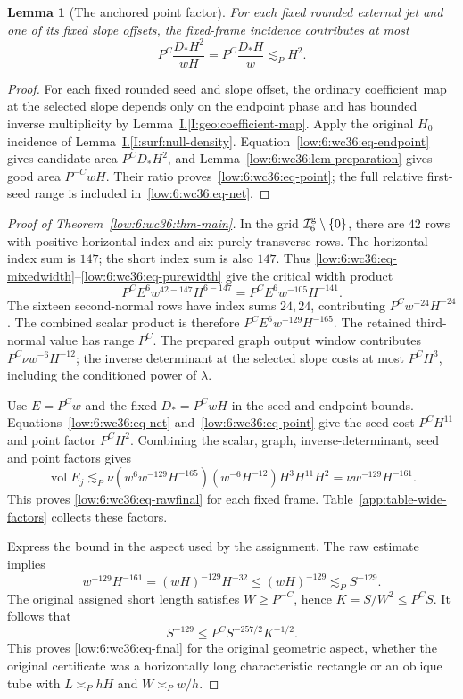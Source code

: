 \documentclass[11pt]{amsart}
\newtheorem{lemma}[theorem]{Lemma}
\theoremstyle{definition}
\theoremstyle{remark}
\numberwithin{equation}{section}
\newcommand{\partIref}[1]{\hyperref[I:#1]{I.\ref*{I:#1}}}
\begin{document}
\begin{lemma}[The anchored point factor]\label{low:6:wc36:lem-point}
For each fixed rounded external jet and one of its fixed slope offsets, the fixed-frame incidence contributes at most
\begin{equation}\label{low:6:wc36:eq-point}
P^C\frac{D_*H^2}{wH}=P^C\frac{D_*H}{w}\lesssim_P H^2.
\end{equation}
\end{lemma}
\begin{proof}
For each fixed rounded seed and slope offset, the ordinary coefficient map at the selected slope depends only on the endpoint phase and has bounded inverse multiplicity by Lemma~\partIref{geo:coefficient-map}. Apply the original $H_0$ incidence of Lemma~\partIref{surf:null-density}. Equation~\eqref{low:6:wc36:eq-endpoint} gives candidate area $P^CD_*H^2$, and Lemma~\ref{low:6:wc36:lem-preparation} gives good area $P^{-C}wH$. Their ratio proves~\eqref{low:6:wc36:eq-point}; the full relative first-seed range is included in~\eqref{low:6:wc36:eq-net}.
\end{proof}

\begin{proof}[Proof of Theorem~\ref{low:6:wc36:thm-main}]
In the grid $\mathcal I_6^{\rm g}\setminus\{0\}$, there are $42$ rows with positive horizontal index and six purely transverse rows. The horizontal index sum is $147$; the short index sum is also $147$. Thus \eqref{low:6:wc36:eq-mixedwidth}--\eqref{low:6:wc36:eq-purewidth} give the critical width product
\[
P^CE^6w^{42-147}H^{6-147}=P^CE^6w^{-105}H^{-141}.
\]
The sixteen second-normal rows have index sums $24,24$, contributing $P^Cw^{-24}H^{-24}$. The combined scalar product is therefore $P^CE^6w^{-129}H^{-165}$. The retained third-normal value has range $P^C$. The prepared graph output window contributes $P^C\nu w^{-6}H^{-12}$; the inverse determinant at the selected slope costs at most $P^CH^3$, including the conditioned power of $\lambda$.

Use $E=P^Cw$ and the fixed $D_*=P^CwH$ in the seed and endpoint bounds. Equations~\eqref{low:6:wc36:eq-net} and~\eqref{low:6:wc36:eq-point} give the seed cost $P^CH^{11}$ and point factor $P^CH^2$. Combining the scalar, graph, inverse-determinant, seed and point factors gives
\[
\operatorname{vol}E_j\lesssim_P\nu(w^6w^{-129}H^{-165})(w^{-6}H^{-12})H^3H^{11}H^2=\nu w^{-129}H^{-161}.
\]
This proves \eqref{low:6:wc36:eq-rawfinal} for each fixed frame. Table~\ref{app:table-wide-factors} collects these factors.

Express the bound in the aspect used by the assignment. The raw estimate implies
\[
w^{-129}H^{-161}=(wH)^{-129}H^{-32}\le(wH)^{-129}\lesssim_P S^{-129}.
\]
The original assigned short length satisfies $W\ge P^{-C}$, hence $K=S/W^2\le P^CS$. It follows that
\[
S^{-129}\le P^C S^{-257/2}K^{-1/2}.
\]
This proves \eqref{low:6:wc36:eq-final} for the original geometric aspect, whether the original certificate was a horizontally long characteristic rectangle or an oblique tube with $L\asymp_PhH$ and $W\asymp_Pw/h$.
\end{proof}
\end{document}
